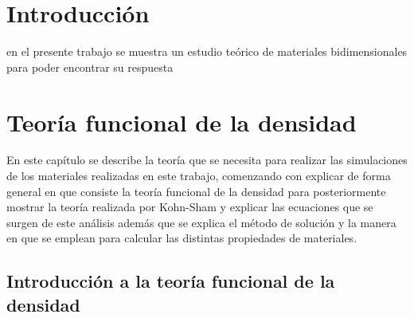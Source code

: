 \documentclass[12pt,a4paper, oneside]{book}
\begin{document}
	\tableofcontents
	\listoffigures
	\chapter{Introducci\'on}
	en el presente trabajo se muestra un estudio  te\'orico de materiales bidimensionales para poder encontrar su respuesta 
	\chapter{Teor\'ia funcional de la densidad} \label{cap:DFT}
	En este cap\'itulo se describe la teor\'ia que se necesita para realizar las simulaciones de los materiales realizadas en este trabajo, comenzando con explicar de forma general en que consiste la teoría funcional de la densidad para posteriormente mostrar la teor\'ia realizada por Kohn-Sham y explicar las ecuaciones que se surgen de este an\'alisis adem\'as que se explica el m\'etodo de soluci\'on y la manera en que se  emplean para calcular las distintas propiedades de materiales.
	\newline 
	\section{Introducci\'on a la teor\'ia funcional de la densidad} \label{sec:introdft}
	
\end{document}
